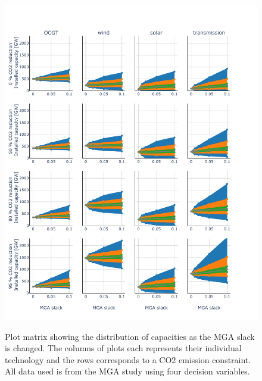 \begin{figure}[p]\centerfloat
\includegraphics[width=1.1\textwidth,trim={0 0cm 0 0cm},clip]{./Images/Capacaty_vs_cost}
\label{fig:cap_vs_cost}
\caption{Plot matrix showing the distribution of capacities as the MGA slack is changed. The columns of plots each represents their individual technology and the rows corresponds to a CO2 emission constraint. All data used is from the MGA study using four decision variables.}
\end{figure}
